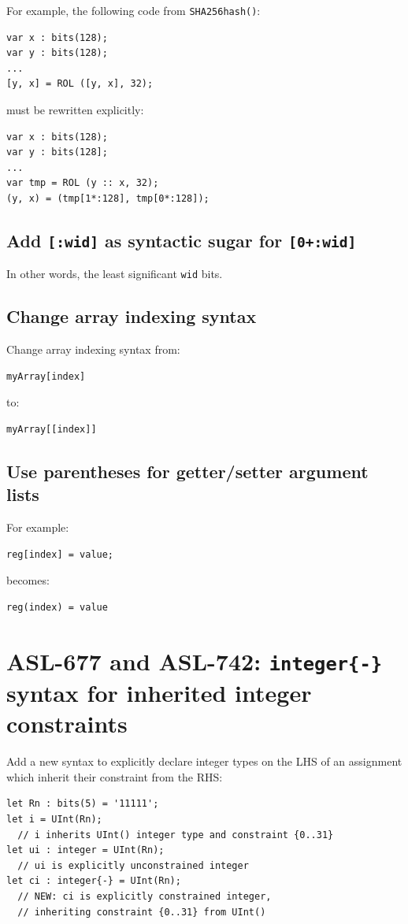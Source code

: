For example, the following code from \texttt{SHA256hash()}:
\begin{verbatim}
var x : bits(128);
var y : bits(128);
...
[y, x] = ROL ([y, x], 32);
\end{verbatim}
must be rewritten explicitly:
\begin{verbatim}
var x : bits(128);
var y : bits(128];
...
var tmp = ROL (y :: x, 32);
(y, x) = (tmp[1*:128], tmp[0*:128]);
\end{verbatim}

\subsection{Add \texttt{[:wid]} as syntactic sugar for \texttt{[0+:wid]}}

In other words, the least significant \texttt{wid} bits.

\subsection{Change array indexing syntax}

Change array indexing syntax from:
\begin{verbatim}
myArray[index]
\end{verbatim}
to:
\begin{verbatim}
myArray[[index]]
\end{verbatim}

\subsection{Use parentheses for getter/setter argument lists}

For example:
\begin{verbatim}
reg[index] = value;
\end{verbatim}
becomes:
\begin{verbatim}
reg(index) = value
\end{verbatim}

\section{ASL-677 and ASL-742: \texttt{integer\{-\}} syntax for inherited integer constraints}
Add a new syntax to explicitly declare integer types on the LHS of an assignment
which inherit their constraint from the RHS:

\begin{verbatim}
let Rn : bits(5) = '11111';
let i = UInt(Rn);
  // i inherits UInt() integer type and constraint {0..31}
let ui : integer = UInt(Rn);
  // ui is explicitly unconstrained integer
let ci : integer{-} = UInt(Rn);
  // NEW: ci is explicitly constrained integer,
  // inheriting constraint {0..31} from UInt()
\end{verbatim}

